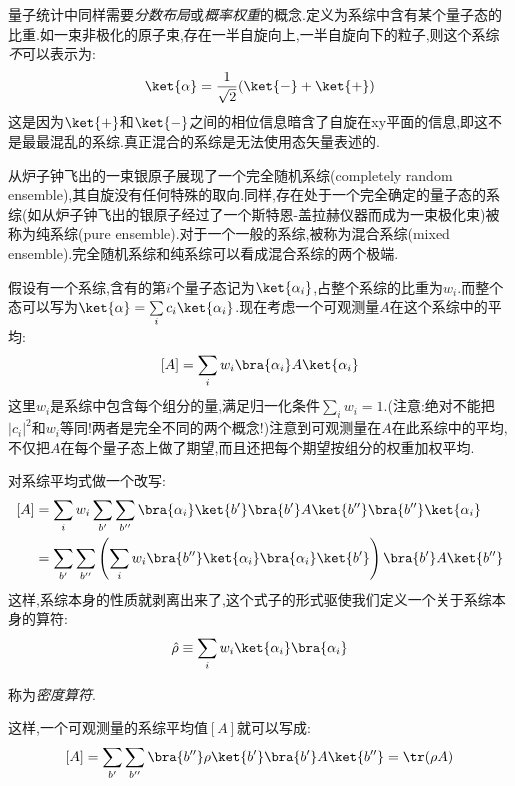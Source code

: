     \vspace*{0.5cm} 

    量子统计中同样需要\emph{分数布局}或\emph{概率权重}的概念.定义为系综中含有某个量子态的比重.如一束非极化的原子束,存在一半自旋向上,一半自旋向下的粒子,则这个系综\emph{不}可以表示为:
    \[\ket{\alpha}=\frac{1}{\sqrt{2}}(\ket{-}+\ket{+})\]
    这是因为$\ket{+}$和$\ket{-}$之间的相位信息暗含了自旋在xy平面的信息,即这不是最最混乱的系综.真正混合的系综是无法使用态矢量表述的.

    从炉子钟飞出的一束银原子展现了一个完全随机系综(completely random ensemble),其自旋没有任何特殊的取向.同样,存在处于一个完全确定的量子态的系综(如从炉子钟飞出的银原子经过了一个斯特恩-盖拉赫仪器而成为一束极化束)被称为纯系综(pure ensemble).对于一个一般的系综,被称为混合系综(mixed ensemble).完全随机系综和纯系综可以看成混合系综的两个极端.

    \vspace*{1cm}

    假设有一个系综,含有的第$i$个量子态记为$\ket{\alpha_i}$,占整个系综的比重为$w_i$.而整个态可以写为$\ket{\alpha}=\sum\limits_i c_i \ket{\alpha_i}$.现在考虑一个可观测量$A$在这个系综中的平均:
    \[[A]=\sum_i w_i \bra{\alpha_i}A\ket{\alpha_i}\]
    这里$w_i$是系综中包含每个组分的量,满足归一化条件$\sum\limits_i w_i=1$.(注意:绝对不能把$\left\vert c_i \right\vert ^{2}$和$w_i$等同!两者是完全不同的两个概念!)注意到可观测量在$A$在此系综中的平均,不仅把$A$在每个量子态上做了期望,而且还把每个期望按组分的权重加权平均.

    \vspace*{0.5cm}

    对系综平均式做一个改写:
    \begin{align*}
     \left[ A \right] &=\sum_i w_i \sum_{b'}\sum_{b''}\bra{\alpha_i}\ket{b'}\bra{b'}A\ket{b''}\bra{b''}\ket{\alpha_i}\\ 
     &=\sum_{b'}\sum_{b''}\left( \sum_i w_i \bra{b''}\ket{\alpha_i}\bra{\alpha_i}\ket{b'} \right) \bra{b'}A\ket{b''}
    \end{align*}
    这样,系综本身的性质就剥离出来了,这个式子的形式驱使我们定义一个关于系综本身的算符:
    \begin{equation}
      \hat{\rho}\equiv \sum_i w_i \ket{\alpha_i}\bra{\alpha_i}
    \end{equation}
    
    称为\emph{密度算符}.

    \vspace*{0.5cm}

    这样,一个可观测量的系综平均值$\left[ A \right] $就可以写成:
    \begin{equation}
      \left[ A \right] =\sum_{b'}\sum_{b''}\bra{b''}\rho\ket{b'}\bra{b'}A\ket{b''}=\tr(\rho A)
    \end{equation}

